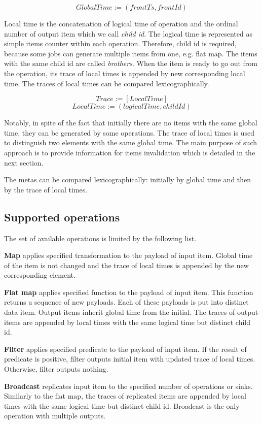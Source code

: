 \[GlobalTime := (frontTs, frontId)\]

Local time is the concatenation of logical time of operation and the ordinal number of output item which we call {\it child id}. The logical time is represented as simple items counter within each operation. Therefore, child id is required, because some jobs can generate multiple items from one, e.g. flat map. The items with the same child id are called {\it brothers}. When the item is ready to go out from the operation, its trace of local times is appended by new corresponding local time. The traces of local times can be compared lexicographically.

\[Trace := [LocalTime]\]
\[LocalTime := (logicalTime, childId)\]

Notably, in spite of the fact that initially there are no items with the same global time, they can be generated by some operations. The trace of local times is used to distinguish two elements with the same global time. The main purpose of such approach is to provide information for items invalidation which is detailed in the next section.

The metas can be compared lexicographically: initially by global time and then by the trace of local times.

\subsection{Supported operations}
The set of available operations is limited by the following list.

{\bf Map} applies specified transformation to the payload of input item. Global time of the item is not changed and the trace of local times is appended by the new corresponding element.

{\bf Flat map} applies specified function to the payload of input item. This function returns a sequence of new payloads. Each of these payloads is put into distinct data item. Output items inherit global time from the initial. The traces of output items are appended by local times with the same logical time but distinct child id.

{\bf Filter} applies specified predicate to the payload of input item. If the result of predicate is positive, filter outputs initial item with updated trace of local times. Otherwise, filter outputs nothing.

{\bf Broadcast} replicates input item to the specified number of operations or sinks. Similarly to the flat map, the traces of replicated items are appended by local times with the same logical time but distinct child id. Broadcast is the only operation with multiple outputs.

